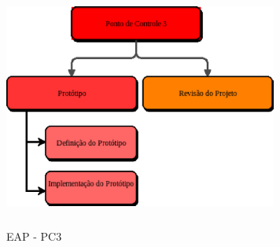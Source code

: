  \begin{figure}[!htb]
    \centering
    \includegraphics[width=9cm, height=8cm, keepaspectratio=true]{figuras/eap/EAP_3.eps}
    \caption{EAP - PC3}
 \end{figure}